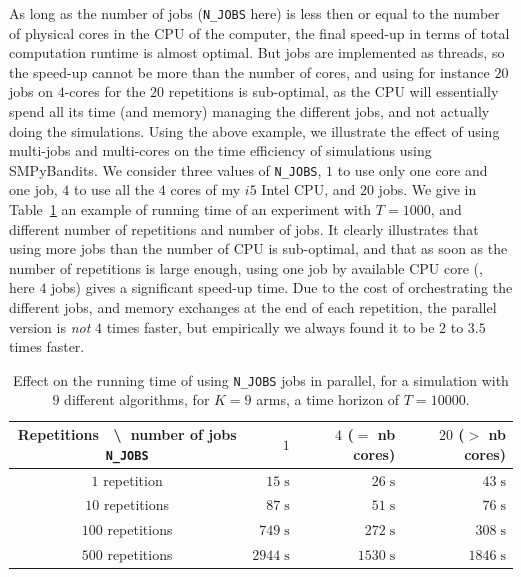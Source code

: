 As long as the number of jobs (\texttt{N\_JOBS} here) is less then or equal to the number of physical cores in the CPU of the computer, the final speed-up in terms of total computation runtime is almost optimal.
But jobs are implemented as threads, so the speed-up cannot be more than the number of cores, and using for instance $20$ jobs on $4$-cores for the $20$ repetitions is sub-optimal, as the CPU will essentially spend all its time (and memory) managing the different jobs, and not actually doing the simulations.
Using the above example, we illustrate the effect of using multi-jobs and multi-cores on the time efficiency of simulations using SMPyBandits. We consider three values of \texttt{N\_JOBS}, $1$ to use only one core and one job, $4$ to use all the $4$ cores of my $i5$ Intel CPU, and $20$ jobs.
We give in Table~\ref{table:3:speedUpTimeParallelComputations} an example of running time of an experiment with $T=1000$, and different number of repetitions and number of jobs.
It clearly illustrates that using more jobs than the number of CPU is sub-optimal, and that as soon as the number of repetitions is large enough, using one job by available CPU core (\ie, here $4$ jobs) gives a significant speed-up time.
Due to the cost of orchestrating the different jobs, and memory exchanges at the end of each repetition, the parallel version is \emph{not} $4$ times faster, but empirically we always found it to be $2$ to $3.5$ times faster.


\begin{table}[ht]
    \centering
    \begin{tabular}{c|rrr}
    \textbf{Repetitions} $\;$ \textbackslash $\;$ number of jobs \texttt{N\_JOBS} & $1$ & $4$ ($=$ nb cores) & $20$ ($>$ nb cores) \\
        \hline
        $1$ repetition    & $15 \;\text{s}$ & $26 \;\text{s}$ & $43 \;\text{s}$ \\
        $10$ repetitions  & $87 \;\text{s}$ & $51 \;\text{s}$ & $76 \;\text{s}$ \\
        $100$ repetitions & $749 \;\text{s}$ & $272 \;\text{s}$ & $308 \;\text{s}$ \\
        $500$ repetitions & $2944 \;\text{s}$ & $1530 \;\text{s}$ & $1846 \;\text{s}$ \\
    \end{tabular}
    \caption{Effect on the running time of using \texttt{N\_JOBS} jobs in parallel, for a simulation with $9$ different algorithms, for $K=9$ arms, a time horizon of $T=10000$.}
    \label{table:3:speedUpTimeParallelComputations}
\end{table}


